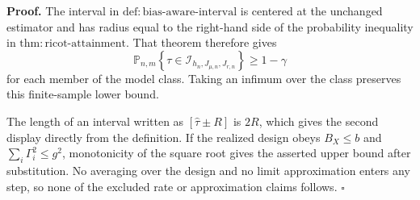 \textbf{Proof.}
The interval in \(\mathrm{def:bias\text{-}aware\text{-}interval}\) is centered at the unchanged estimator and has radius equal to the right-hand side of the probability inequality in \(\mathrm{thm:ricot\text{-}attainment}\). That theorem therefore gives
\[
\mathbb P_{n,m}\left\{\tau\in\mathcal I_{h_n,J_{\mu,n},J_{r,n}}\right\}\ge1-\gamma
\]
for each member of the model class. Taking an infimum over the class preserves this finite-sample lower bound.

The length of an interval written as \([\widehat\tau\pm R]\) is \(2R\), which gives the second display directly from the definition. If the realized design obeys \(B_X\le b\) and \(\sum_i\Gamma_i^2\le g^2\), monotonicity of the square root gives the asserted upper bound after substitution. No averaging over the design and no limit approximation enters any step, so none of the excluded rate or approximation claims follows. \(\square\)
